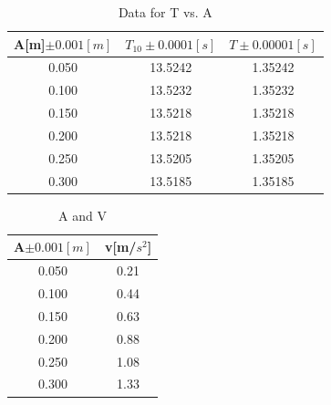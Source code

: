 \documentclass[11pt,a4paper]{article}
\begin{document}
                    \begin{table}[H]
                        \centering
                        \begin{tabular}{|c|c|c|}
                        \hline
                        A[m]$\pm 0.001[m]$& $T_{10}\pm 0.0001[s]$&$T\pm 0.00001[s]$\\\hline
                        0.050 & 13.5242 & 1.35242 \\ \hline
                        0.100 & 13.5232 & 1.35232 \\ \hline
                        0.150 & 13.5218 & 1.35218 \\ \hline
                        0.200 & 13.5218 & 1.35218 \\ \hline
                        0.250 & 13.5205 & 1.35205 \\ \hline
                        0.300 & 13.5185 & 1.35185 \\ \hline
                        \end{tabular}
                        \caption{Data for T vs. A}
                        \label{TADATA}
                        \end{table}
                        \begin{table}[H]
                            \centering
                            \begin{tabular}{|c|c|}
                            \hline
                            \textbf{A$\pm 0.001[m]$} & \textbf{v{[}m/$s^2${]}} \\ \hline
                            0.050                    & 0.21                    \\ \hline
                            0.100                    & 0.44                    \\ \hline
                            0.150                    & 0.63                    \\ \hline
                            0.200                    & 0.88                    \\ \hline
                            0.250                    & 1.08                    \\ \hline
                            0.300                    & 1.33                    \\ \hline
                            \end{tabular}
                            \caption{A and V}
                            \label{AandV}
                            \end{table}
\end{document}
